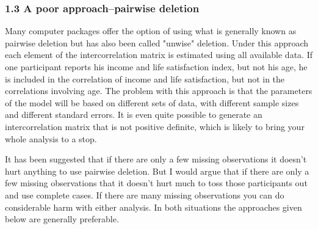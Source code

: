 \subsubsection{1.3 A poor approach--pairwise deletion}

Many computer packages offer the option of using what is generally known as pairwise deletion but has also been called "unwise" deletion. Under this approach each element of the intercorrelation matrix is estimated using all available data. If one participant reports his income and life satisfaction index, but not his age, he is included in the correlation of income and life satisfaction, but not in the correlations involving age. The problem with this approach is that the parameters of the model will be based on different sets of data, with different sample sizes and different standard errors. It is even quite possible to generate an intercorrelation matrix that is not positive definite, which is likely to bring your whole analysis to a stop.

It has been suggested that if there are only a few missing observations it doesn't hurt anything to use pairwise deletion. But I would argue that if there are only a few missing observations that it doesn't hurt much to toss those participants out and use complete cases. If there are many missing observations you can do considerable harm with either analysis. In both situations the approaches given below are generally preferable.




